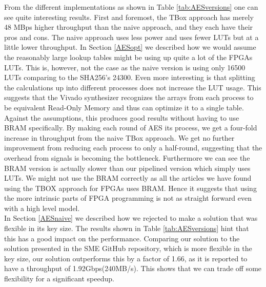 \documentclass[a4paper, openany]{book}
\begin{document}
From the different implementations as shown in Table \ref{tab:AESversions} one can see quite interesting results. First and foremost, the TBox approach has merely 48 MBps higher throughput than the naive approach, and they each have their pros and cons. The naive approach uses less power and uses fewer LUTs but at a little lower throughput. In Section \ref{AESopt} we described how we would assume the reasonably large lookup tables might be using up quite a lot of the FPGAs LUTs. This is, however, not the case as the naive version is using only 16500 LUTs comparing to the SHA256's 24300. Even more interesting is that splitting the calculations up into different processes does not increase the LUT usage. This suggests that the Vivado synthesizer recognizes the arrays from each process to be equivalent Read-Only Memory and thus can optimize it to a single table. Against the assumptions, this produces good results without having to use BRAM specifically. By making each round of AES its process, we get a four-fold increase in throughput from the naive TBox approach. We get no further improvement from reducing each process to only a half-round, suggesting that the overhead from signals is becoming the bottleneck. Furthermore we can see the BRAM version is actually slower than our pipelined version which simply uses LUTs. We might not use the BRAM correctly as all the articles we have found using the TBOX approach for FPGAs uses BRAM. Hence it suggests that using the more intrinsic parts of FPGA programming is not as straight forward even with a high level model.\\
In Section \ref{AESnaive} we described how we rejected to make a solution that was flexible in its key size. The results shown in Table \ref{tab:AESversions} hint that this has a good impact on the performance. Comparing our solution to the solution presented in the SME GitHub repository\cite{sme}, which is more flexible in the key size, our solution outperforms this by a factor of 1.66, as it is reported to have a throughput of 1.92Gbps(240MB/s)\cite{sme}. This shows that we can trade off some flexibility for a significant speedup.
\end{document}
